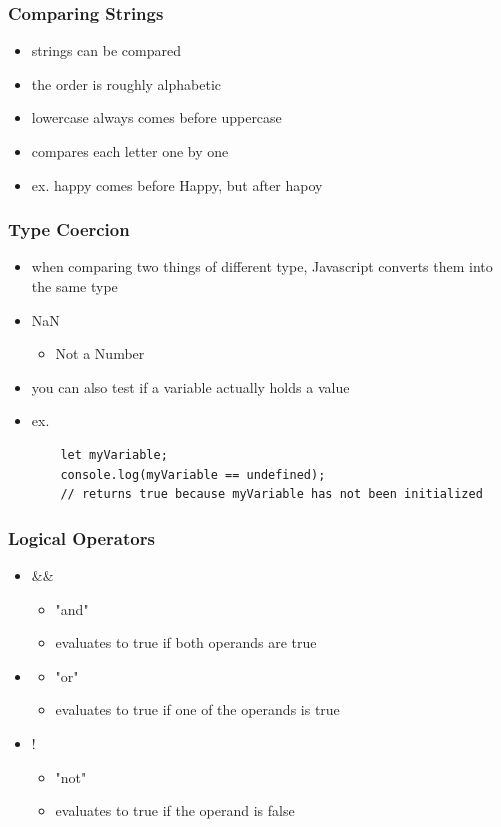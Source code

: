 \documentclass{beamer}
\begin{document}
\begin{frame}
\frametitle{Comparing Strings}
\begin{itemize}
	\item strings can be compared
	\item the order is roughly alphabetic
	\item lowercase always comes before uppercase
	\item compares each letter one by one
	\item ex. happy comes before Happy, but after hapoy
\end{itemize}
\end{frame}

\begin{frame}[fragile]
\frametitle{Type Coercion}
\begin{itemize}
	\item when comparing two things of different type, Javascript converts them into the same type
	\item NaN
		\begin{itemize}
			\item Not a Number
		\end{itemize}
	\item you can also test if a variable actually holds a value
	\item ex. \begin{lstlisting}
	let myVariable;
	console.log(myVariable == undefined);
	// returns true because myVariable has not been initialized
	\end{lstlisting}
\end{itemize}
\end{frame}

\begin{frame}
\frametitle{Logical Operators}
\begin{itemize}
	\item \&\&
		\begin{itemize}
			\item "and"
			\item evaluates to true if both operands are true
		\end{itemize}
	\item \textbar \textbar
		\begin{itemize}
			\item "or"
			\item evaluates to true if one of the operands is true
		\end{itemize}
	\item !
		\begin{itemize}
			\item "not"
			\item evaluates to true if the operand is false
		\end{itemize}
\end{itemize}
\end{frame}
\end{document}
